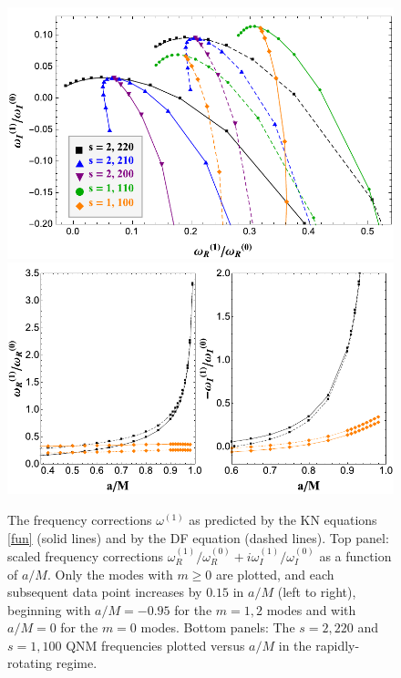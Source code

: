 \begin{refsection}
\begin{figure}[t]
\includegraphics[width=1.0\columnwidth]{chapter_KN_QNM/etc/PRLFig1TopSept17}
\includegraphics[width=1.0\columnwidth]{chapter_KN_QNM/etc/PRLFig1BotSept17}
\caption{The frequency corrections $\omega^{(1)}$ as predicted by the KN equations \eqref{fun} (solid lines) and by the DF equation (dashed lines). Top panel: scaled frequency corrections $\omega^{(1)}_R/\omega^{(0)}_R+i\omega^{(1)}_I/\omega^{(0)}_I$ as a function of $a/M$. Only the modes with $m \geq 0$ are plotted, and each subsequent data point increases by $0.15$ in $a/M$ (left to right), beginning with $a/M = -0.95$ for the $m=1,2$ modes and with $a/M=0$ for the $m=0$ modes. Bottom panels: The $s=2, 220$ and $s=1, 100$ QNM frequencies plotted versus $a/M$ in the rapidly-rotating regime.}
\label{fig:Corrections}
\end{figure}


\end{refsection}
